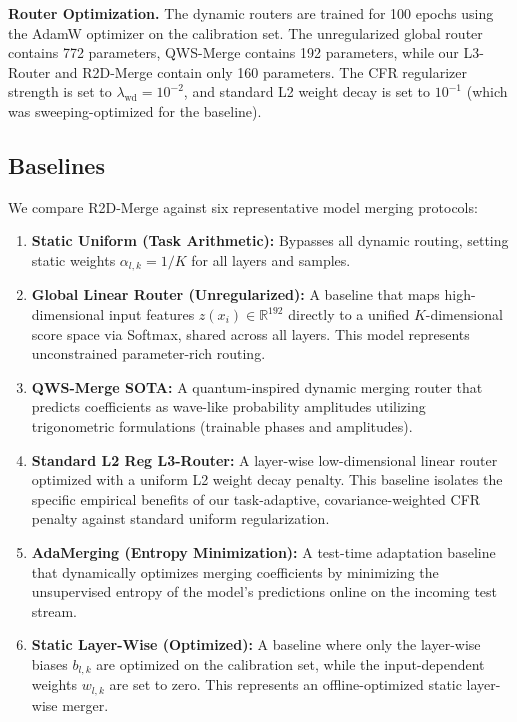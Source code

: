 \textbf{Router Optimization.} The dynamic routers are trained for 100 epochs using the AdamW optimizer on the calibration set. The unregularized global router contains 772 parameters, QWS-Merge contains 192 parameters, while our L3-Router and R2D-Merge contain only 160 parameters. The CFR regularizer strength is set to $\lambda_{\text{wd}} = 10^{-2}$, and standard L2 weight decay is set to $10^{-1}$ (which was sweeping-optimized for the baseline).

\subsection{Baselines}
We compare R2D-Merge against six representative model merging protocols:
\begin{enumerate}
    \item \textbf{Static Uniform (Task Arithmetic):} Bypasses all dynamic routing, setting static weights $\alpha_{l, k} = 1/K$ for all layers and samples.
    \item \textbf{Global Linear Router (Unregularized):} A baseline that maps high-dimensional input features $z(x_i) \in \mathbb{R}^{192}$ directly to a unified $K$-dimensional score space via Softmax, shared across all layers. This model represents unconstrained parameter-rich routing.
    \item \textbf{QWS-Merge SOTA:} A quantum-inspired dynamic merging router that predicts coefficients as wave-like probability amplitudes utilizing trigonometric formulations (trainable phases and amplitudes).
    \item \textbf{Standard L2 Reg L3-Router:} A layer-wise low-dimensional linear router optimized with a uniform L2 weight decay penalty. This baseline isolates the specific empirical benefits of our task-adaptive, covariance-weighted CFR penalty against standard uniform regularization.
    \item \textbf{AdaMerging (Entropy Minimization):} A test-time adaptation baseline that dynamically optimizes merging coefficients by minimizing the unsupervised entropy of the model's predictions online on the incoming test stream.
    \item \textbf{Static Layer-Wise (Optimized):} A baseline where only the layer-wise biases $b_{l,k}$ are optimized on the calibration set, while the input-dependent weights $w_{l,k}$ are set to zero. This represents an offline-optimized static layer-wise merger.
\end{enumerate}

